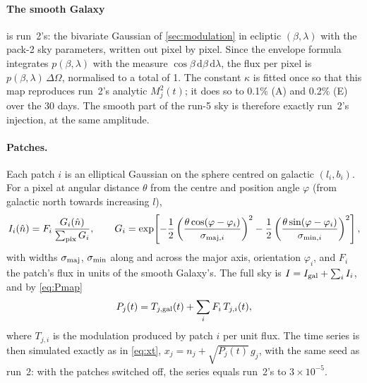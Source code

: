 \documentclass[11pt,a4paper]{article}
\newcommand{\dd}{\mathrm{d}}
\begin{document}
\paragraph{The smooth Galaxy} is run~2's: the bivariate Gaussian of
\cref{sec:modulation} in ecliptic $(\beta,\lambda)$ with the pack-2 sky parameters,
written out pixel by pixel. Since the envelope formula integrates $p(\beta,\lambda)$ with
the measure $\cos\beta\,\dd\beta\,\dd\lambda$, the flux per pixel is
$p(\beta,\lambda)\,\Delta\Omega$, normalised to a total of 1. The constant $\kappa$ is
fitted once so that this map reproduces run~2's analytic $M_j^2(t)$; it does so to
0.1\% (A) and 0.2\% (E) over the 30 days. The smooth part of the run-5 sky is
therefore exactly run~2's injection, at the same amplitude.

\paragraph{Patches.} Each patch $i$ is an elliptical Gaussian on the sphere centred on
galactic $(l_i,b_i)$. For a pixel at angular distance $\theta$ from the centre and
position angle $\varphi$ (from galactic north towards increasing $l$),
\begin{equation}
  I_i(\hat n) = F_i\,\frac{G_i(\hat n)}{\sum_{\rm pix}G_i},\qquad
  G_i = \exp\!\left[-\frac12\left(\frac{\theta\cos(\varphi-\varphi_i)}{\sigma_{{\rm maj},i}}\right)^2
  -\frac12\left(\frac{\theta\sin(\varphi-\varphi_i)}{\sigma_{{\rm min},i}}\right)^2\right],
  \label{eq:patch}
\end{equation}
with widths $\sigma_{\rm maj}$, $\sigma_{\rm min}$ along and across the major axis,
orientation $\varphi_i$, and $F_i$ the patch's flux in units of the smooth Galaxy's.
The full sky is $I=I_{\rm gal}+\sum_iI_i$, and by \cref{eq:Pmap}
\begin{equation}
  P_j(t) = T_{j,{\rm gal}}(t) + \sum_i F_i\,T_{j,i}(t),
  \label{eq:Ptemplates}
\end{equation}
where $T_{j,i}$ is the modulation produced by patch $i$ per unit flux. The time series
is then simulated exactly as in \cref{eq:xt}, $x_j=n_j+\sqrt{P_j(t)}\,g_j$, with the
same seed as run~2: with the patches switched off, the series equals run~2's to
$3\times10^{-5}$.
\end{document}
